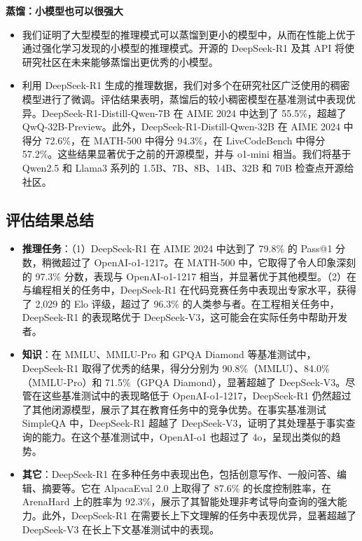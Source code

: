 \documentclass[lang=cn,a4paper,newtx]{elegantpaper}
\newcommand{\dsri}{DeepSeek-R1}
\begin{document}
\textbf{蒸馏：小模型也可以很强大}

\begin{itemize}
  \item 我们证明了大型模型的推理模式可以蒸馏到更小的模型中，从而在性能上优于通过强化学习发现的小模型的推理模式。开源的 \dsri{} 及其 API 将使研究社区在未来能够蒸馏出更优秀的小模型。
  \item 利用 \dsri{} 生成的推理数据，我们对多个在研究社区广泛使用的稠密模型进行了微调。评估结果表明，蒸馏后的较小稠密模型在基准测试中表现优异。DeepSeek-R1-Distill-Qwen-7B 在 AIME 2024 中达到了 55.5\%，超越了 QwQ-32B-Preview。此外，DeepSeek-R1-Distill-Qwen-32B 在 AIME 2024 中得分 72.6\%，在 MATH-500 中得分 94.3\%，在 LiveCodeBench 中得分 57.2\%。这些结果显著优于之前的开源模型，并与 o1-mini 相当。我们将基于 Qwen2.5 和 Llama3 系列的 1.5B、7B、8B、14B、32B 和 70B 检查点开源给社区。
\end{itemize}

\subsection{评估结果总结}

\begin{itemize}
  \item \textbf{推理任务}：（1）\dsri{} 在 AIME 2024 中达到了 79.8\% 的 Pass@1 分数，稍微超过了 OpenAI-o1-1217。在 MATH-500 中，它取得了令人印象深刻的 97.3\% 分数，表现与 OpenAI-o1-1217 相当，并显著优于其他模型。（2）在与编程相关的任务中，\dsri{} 在代码竞赛任务中表现出专家水平，获得了 2,029 的 Elo 评级，超过了 96.3\% 的人类参与者。在工程相关任务中，\dsri{} 的表现略优于 DeepSeek-V3，这可能会在实际任务中帮助开发者。
  \item \textbf{知识}：在 MMLU、MMLU-Pro 和 GPQA Diamond 等基准测试中，\dsri{} 取得了优秀的结果，得分分别为 90.8\%（MMLU）、84.0\%（MMLU-Pro）和 71.5\%（GPQA Diamond），显著超越了 DeepSeek-V3。尽管在这些基准测试中的表现略低于 OpenAI-o1-1217，\dsri{} 仍然超过了其他闭源模型，展示了其在教育任务中的竞争优势。在事实基准测试 SimpleQA 中，\dsri{} 超越了 DeepSeek-V3，证明了其处理基于事实查询的能力。在这个基准测试中，OpenAI-o1 也超过了 4o，呈现出类似的趋势。
  \item \textbf{其它}：\dsri{} 在多种任务中表现出色，包括创意写作、一般问答、编辑、摘要等。它在 AlpacaEval 2.0 上取得了 87.6\% 的长度控制胜率，在 ArenaHard 上的胜率为 92.3\%，展示了其智能处理非考试导向查询的强大能力。此外，\dsri{} 在需要长上下文理解的任务中表现优异，显著超越了 DeepSeek-V3 在长上下文基准测试中的表现。
\end{itemize}
\end{document}
